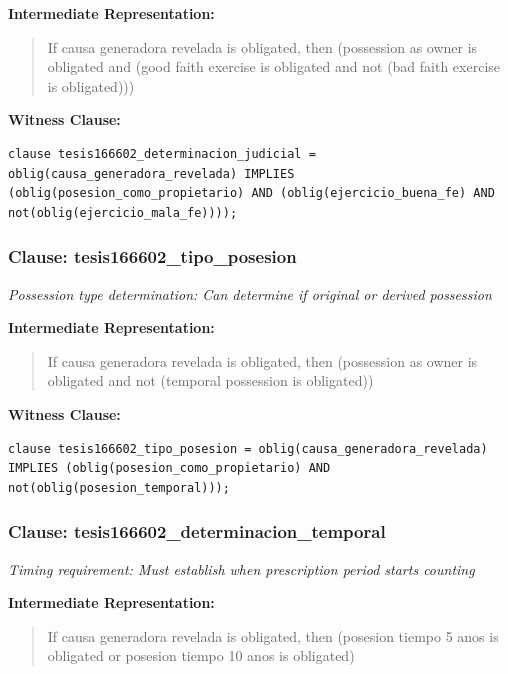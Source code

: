 \documentclass[11pt,a4paper]{article}
\begin{document}
\textbf{Intermediate Representation:}

\begin{quote}
If causa generadora revelada is obligated, then (possession as owner is obligated and (good faith exercise is obligated and not (bad faith exercise is obligated)))
\end{quote}

\textbf{Witness Clause:}

\begin{lstlisting}[style=witnessstyle, language=Witness]
clause tesis166602_determinacion_judicial = oblig(causa_generadora_revelada) IMPLIES (oblig(posesion_como_propietario) AND (oblig(ejercicio_buena_fe) AND not(oblig(ejercicio_mala_fe))));
\end{lstlisting}

\subsubsection{Clause: tesis166602\_tipo\_posesion}

\textit{Possession type determination: Can determine if original or derived possession}

\textbf{Intermediate Representation:}

\begin{quote}
If causa generadora revelada is obligated, then (possession as owner is obligated and not (temporal possession is obligated))
\end{quote}

\textbf{Witness Clause:}

\begin{lstlisting}[style=witnessstyle, language=Witness]
clause tesis166602_tipo_posesion = oblig(causa_generadora_revelada) IMPLIES (oblig(posesion_como_propietario) AND not(oblig(posesion_temporal)));
\end{lstlisting}

\subsubsection{Clause: tesis166602\_determinacion\_temporal}

\textit{Timing requirement: Must establish when prescription period starts counting}

\textbf{Intermediate Representation:}

\begin{quote}
If causa generadora revelada is obligated, then (posesion tiempo 5 anos is obligated or posesion tiempo 10 anos is obligated)
\end{quote}
\end{document}
